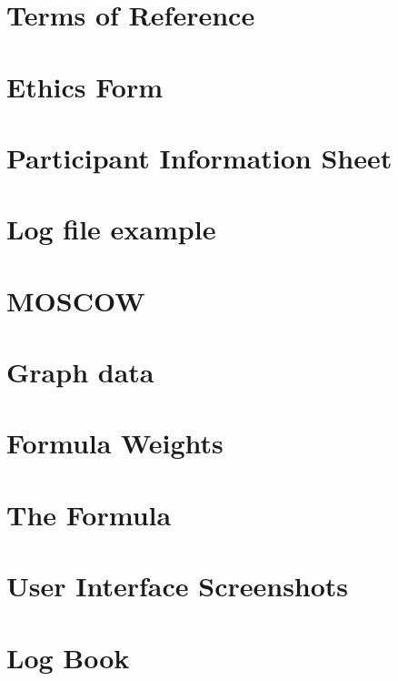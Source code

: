 \chapter{Terms of Reference}
\chapter{Ethics Form}

\chapter{Participant Information Sheet}

\chapter{Log file example} \label{Log file example}

\chapter{MOSCOW} \label{Moscow}

\chapter{Graph data} \label{Graph data}

\chapter{Formula Weights}

\chapter{The Formula} \label{code}

\chapter{User Interface Screenshots} \label{User Interface Screenshots}

\chapter{Log Book}
